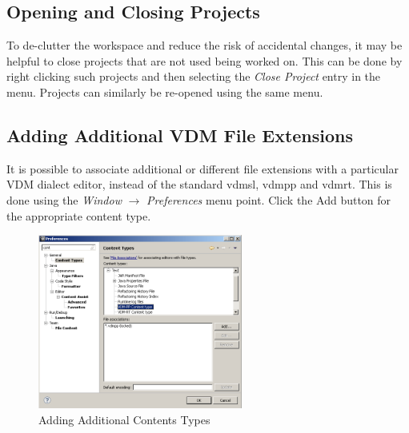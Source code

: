 \documentclass{overturerepchap}
\begin{document}
\subsection{Opening and Closing Projects}

To de-clutter the workspace and reduce the risk of accidental changes,
it may be helpful to close projects that are not used being worked on.
This can be done by right clicking such projects and then selecting the
\emph{Close Project} entry in the menu. Projects can similarly be re-opened
using the same menu. 
 

\subsection{Adding Additional VDM File Extensions}

It is possible to associate additional or different file extensions with a
particular VDM dialect editor, instead of the standard {\ttfamily vdmsl},
{\ttfamily vdmpp} and {\ttfamily vdmrt}. This is done using the \emph{Window}
$\rightarrow$ \emph{Preferences} menu point. Click the {\ttfamily Add}
button for the appropriate content type.

\begin{figure}[!htb]
\begin{center}
\includegraphics[width=0.6\textwidth]{screenDumps/contentstypes}
\caption{Adding Additional Contents Types\label{fig:ContentsTypes}}
\end{center}
\end{figure}
\end{document}
